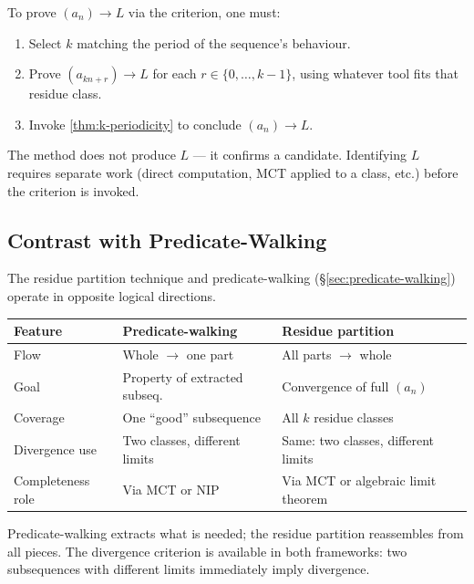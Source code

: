 \begin{remark}
To prove $(a_n) \to L$ via the criterion, one must:
\begin{enumerate}
  \item Select $k$ matching the period of the sequence's behaviour.
  \item Prove $(a_{kn+r}) \to L$ for each $r \in \{0,\ldots,k-1\}$,
        using whatever tool fits that residue class.
  \item Invoke \cref{thm:k-periodicity} to conclude $(a_n) \to L$.
\end{enumerate}
The method does not produce $L$ --- it confirms a candidate. Identifying
$L$ requires separate work (direct computation, MCT applied to a class,
etc.) before the criterion is invoked.
\end{remark}

\subsection*{Contrast with Predicate-Walking}
\label{subsec:contrast-predicate}

\begin{remark}
The residue partition technique and predicate-walking
(\S\ref{sec:predicate-walking}) operate in opposite logical directions.

\medskip
\begin{tabular}{@{}lll@{}}
\toprule
\textbf{Feature} & \textbf{Predicate-walking} & \textbf{Residue partition} \\
\midrule
Flow & Whole $\to$ one part & All parts $\to$ whole \\
Goal & Property of extracted subseq. & Convergence of full $(a_n)$ \\
Coverage & One ``good'' subsequence & All $k$ residue classes \\
Divergence use & Two classes, different limits & Same: two classes, different limits \\
Completeness role & Via MCT or NIP & Via MCT or algebraic limit theorem \\
\bottomrule
\end{tabular}

\medskip
Predicate-walking extracts what is needed; the residue partition reassembles
from all pieces. The divergence criterion is available in both frameworks:
two subsequences with different limits immediately imply divergence.
\end{remark}

